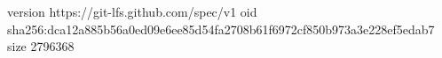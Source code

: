 version https://git-lfs.github.com/spec/v1
oid sha256:dca12a885b56a0ed09e6ee85d54fa2708b61f6972cf850b973a3e228ef5edab7
size 2796368
